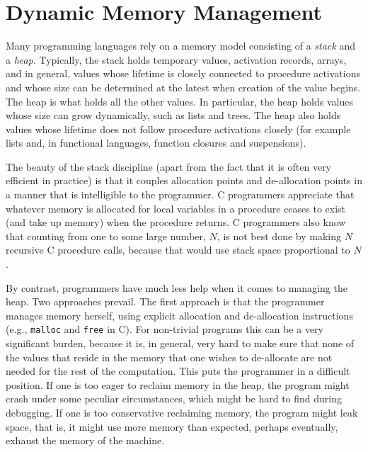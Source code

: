 \documentclass[12pt]{book}
\begin{document}
\section{%
Dynamic Memory Management}
Many programming languages rely on a memory model consisting of a {\em
  stack}
%
and a 
%
{\em heap}. Typically, the stack holds temporary values, activation
records, arrays, and in general, values whose lifetime is closely
connected to procedure activations and whose size can be determined at
the latest when creation of the value begins.  The heap is what holds
all the other values. In particular, the heap holds values whose size
can grow dynamically, such as lists and trees. The heap also holds
values whose lifetime does not follow procedure activations closely
(for example lists and, in functional languages, function closures and
suspensions).

The beauty of the stack discipline (apart from the fact that it is
often very efficient in practice) is that it couples allocation points
and de-allocation points in a manner that is intelligible to the
programmer. C programmers appreciate that whatever memory is allocated
for local variables in a procedure ceases to exist (and take up
memory) when the procedure returns.
%
C programmers also know that counting from one to some large number,
$N$, is not best done by making $N$ recursive C procedure calls,
because that would use stack space proportional to $N$.

By contrast, programmers have much less help when it comes to managing
the heap.  Two approaches prevail. The first approach is that the
programmer manages memory herself, using explicit allocation and
de-allocation instructions (e.g., 
%
{\tt malloc} and 
%
{\tt free} in C). For non-trivial programs this can be a very
significant burden, because it is, in general, very hard to make sure
that none of the values that reside in the memory that one wishes to
de-allocate are not needed for the rest of the computation.  This puts
the programmer in a difficult position. If one is too eager to reclaim
memory in the heap, the program might crash under some peculiar
circumstances, which might be hard to find during debugging.  If one
is too conservative reclaiming memory, the program might leak space,
that is, it might use more memory than expected, perhaps eventually,
exhaust the memory of the machine.
\end{document}
